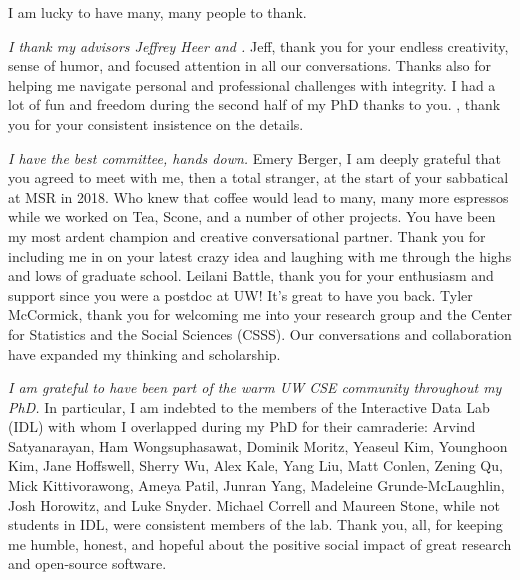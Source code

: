 I am lucky to have many, many people to thank. 

\textit{I thank my advisors Jeffrey Heer and \reneJust.} Jeff, thank you for
your endless creativity, sense of humor, and focused attention in all our
conversations. Thanks also for helping me navigate personal and professional
challenges with integrity. I had a lot of fun and freedom during the second half of my PhD
thanks to you. \rene, thank you for your consistent insistence on
the details.

\textit{I have the best committee, hands down.} Emery Berger, I am deeply grateful
that you agreed to meet with me, then a total stranger, at the start of your
sabbatical at MSR in 2018. Who knew that coffee would lead to many, many
more espressos while we worked on Tea, Scone, and a number of other projects. You have been my most ardent
champion and creative conversational partner. Thank you for including me in on your latest crazy idea and laughing with me
through the highs and lows of graduate school. 
Leilani Battle, thank you for your enthusiasm and support since you were a
postdoc at UW! It's great to have you back.    
Tyler McCormick, thank you for welcoming me into your research group and the
Center for Statistics and the Social Sciences (CSSS). Our conversations and
collaboration have expanded my thinking and scholarship. 

\textit{I am grateful to have been part of the warm UW CSE community throughout
my PhD.} In particular, I am indebted to the members of the Interactive Data Lab
(IDL) with whom I overlapped during my PhD for their camraderie: Arvind
Satyanarayan, Ham Wongsuphasawat, Dominik Moritz, Yeaseul Kim, Younghoon Kim,
Jane Hoffswell, Sherry Wu, Alex Kale, Yang Liu, Matt Conlen, Zening Qu, Mick
Kittivorawong, Ameya Patil, Junran Yang, Madeleine Grunde-McLaughlin, Josh
Horowitz, and Luke Snyder. Michael Correll and Maureen Stone, while not students
in IDL, were consistent members of the lab. Thank you, all, for keeping me
humble, honest, and hopeful about the positive social impact of great research
and open-source software.

